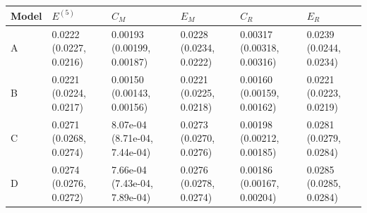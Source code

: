 \documentclass[11pt]{article}
\begin{document}
\begin{table}[!htbp]\centering\footnotesize\setlength{\tabcolsep}{4pt}
\begin{tabular}{llllll}
\toprule
Model & $E^{(5)}$ & $C_M$ & $E_M$ & $C_R$ & $E_R$\\
\midrule
A & \makecell[l]{0.0222\\{\scriptsize(0.0227, 0.0216)}} & \makecell[l]{0.00193\\{\scriptsize(0.00199, 0.00187)}} & \makecell[l]{0.0228\\{\scriptsize(0.0234, 0.0222)}} & \makecell[l]{0.00317\\{\scriptsize(0.00318, 0.00316)}} & \makecell[l]{0.0239\\{\scriptsize(0.0244, 0.0234)}}\\
B & \makecell[l]{0.0221\\{\scriptsize(0.0224, 0.0217)}} & \makecell[l]{0.00150\\{\scriptsize(0.00143, 0.00156)}} & \makecell[l]{0.0221\\{\scriptsize(0.0225, 0.0218)}} & \makecell[l]{0.00160\\{\scriptsize(0.00159, 0.00162)}} & \makecell[l]{0.0221\\{\scriptsize(0.0223, 0.0219)}}\\
C & \makecell[l]{0.0271\\{\scriptsize(0.0268, 0.0274)}} & \makecell[l]{8.07e-04\\{\scriptsize(8.71e-04, 7.44e-04)}} & \makecell[l]{0.0273\\{\scriptsize(0.0270, 0.0276)}} & \makecell[l]{0.00198\\{\scriptsize(0.00212, 0.00185)}} & \makecell[l]{0.0281\\{\scriptsize(0.0279, 0.0284)}}\\
D & \makecell[l]{0.0274\\{\scriptsize(0.0276, 0.0272)}} & \makecell[l]{7.66e-04\\{\scriptsize(7.43e-04, 7.89e-04)}} & \makecell[l]{0.0276\\{\scriptsize(0.0278, 0.0274)}} & \makecell[l]{0.00186\\{\scriptsize(0.00167, 0.00204)}} & \makecell[l]{0.0285\\{\scriptsize(0.0285, 0.0284)}}\\
\bottomrule
\end{tabular}


\end{table}
\end{document}
